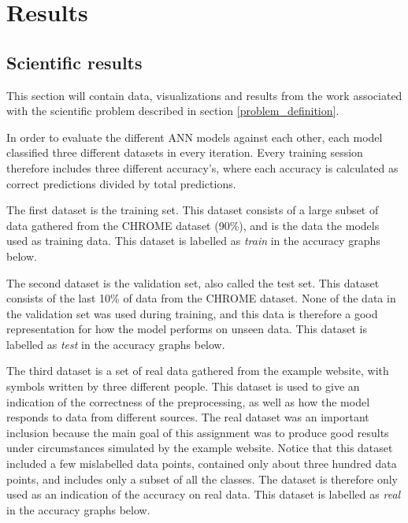 \chapter{Results}

\section{Scientific results}
This section will contain data, visualizations and results from the work associated with the scientific problem described in section \ref{problem_definition}.

In order to evaluate the different ANN models against each other, each model classified three different datasets in every iteration. Every training session therefore includes three different accuracy's, where each accuracy is calculated as correct predictions divided by total predictions.

The first dataset is the training set. This dataset consists of a large subset of data gathered from the CHROME dataset (90\%), and is the data the models used as training data. This dataset is labelled as \textit{train} in the accuracy graphs below. %

The second dataset is the validation set, also called the test set. This dataset consists of the last 10\% of data from the CHROME dataset. None of the data in the validation set was used during training, and this data is therefore a good representation for how the model performs on unseen data. This dataset is labelled as \textit{test} in the accuracy graphs below.

The third dataset is a set of real data gathered from the example website, with symbols written by three different people. This dataset is used to give an indication of the correctness of the preprocessing, as well as how the model responds to data from different sources. The real dataset was an important inclusion because the main goal of this assignment was to produce good results under circumstances simulated by the example website. Notice that this dataset included a few mislabelled data points, contained only about three hundred data points, and includes only a subset of all the classes. The dataset is therefore only used as an indication of the accuracy on real data. This dataset is labelled as \textit{real} in the accuracy graphs below.


